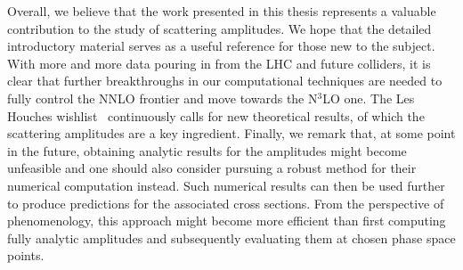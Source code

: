 \documentclass[main.tex]{subfiles}
\begin{document}
Overall, we believe that the work presented in this thesis represents a valuable contribution to the study of scattering amplitudes. We hope that the detailed introductory material serves as a useful reference for those new to the subject. With more and more data pouring in from the LHC and future colliders, it is clear that further breakthroughs in our computational techniques are needed to fully control the NNLO frontier and move towards the N$^3$LO one. The Les Houches wishlist~\cite{Huss:2022ful} continuously calls for new theoretical results, of which the scattering amplitudes are a key ingredient. Finally, we remark that, at some point in the future, obtaining analytic results for the amplitudes might become unfeasible and one should also consider pursuing a robust method for their numerical computation instead. Such numerical results can then be used further to produce predictions for the associated cross sections. From the perspective of phenomenology, this approach might become more efficient than first computing fully analytic amplitudes and subsequently evaluating them at chosen phase space points.
\end{document}
